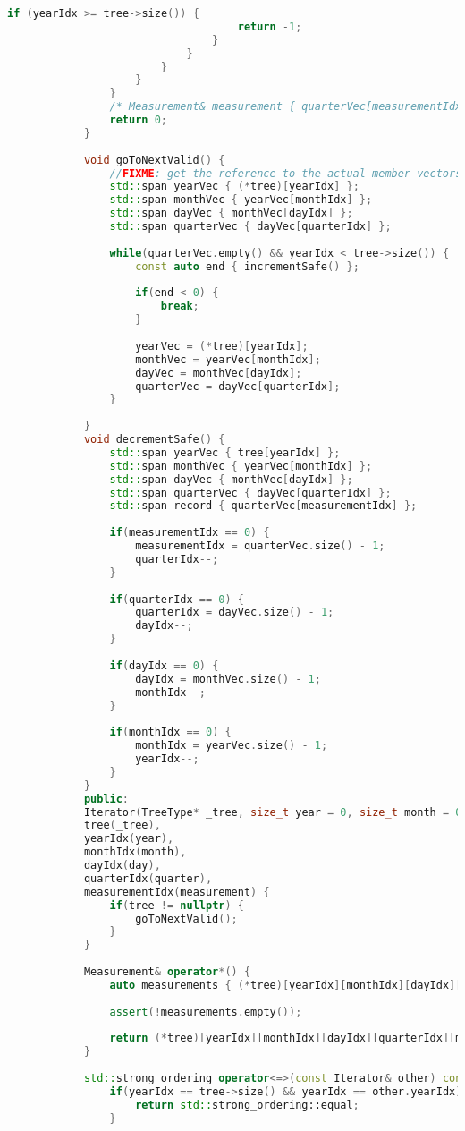 \begin{lstlisting}[caption=Zawartość pliku \texttt{MeasurementsTree.hpp}, label={lst:measurementreehpp}, language=C++]
								if (yearIdx >= tree->size()) {
									return -1;
								}
							}
						}
					}
				}
				/* Measurement& measurement { quarterVec[measurementIdx] }; */
				return 0;
			}
			
			void goToNextValid() {
				//FIXME: get the reference to the actual member vectors not the copies
				std::span yearVec { (*tree)[yearIdx] };
				std::span monthVec { yearVec[monthIdx] };
				std::span dayVec { monthVec[dayIdx] };
				std::span quarterVec { dayVec[quarterIdx] };
				
				while(quarterVec.empty() && yearIdx < tree->size()) {
					const auto end { incrementSafe() };
					
					if(end < 0) {
						break;	
					}
					
					yearVec = (*tree)[yearIdx];            
					monthVec = yearVec[monthIdx];       
					dayVec = monthVec[dayIdx];
					quarterVec = dayVec[quarterIdx];    			
				}
				
			}
			void decrementSafe() {
				std::span yearVec { tree[yearIdx] };
				std::span monthVec { yearVec[monthIdx] };
				std::span dayVec { monthVec[dayIdx] };
				std::span quarterVec { dayVec[quarterIdx] };
				std::span record { quarterVec[measurementIdx] };
				
				if(measurementIdx == 0) {
					measurementIdx = quarterVec.size() - 1;
					quarterIdx--;
				}
				
				if(quarterIdx == 0) {
					quarterIdx = dayVec.size() - 1;
					dayIdx--;
				}
				
				if(dayIdx == 0) {
					dayIdx = monthVec.size() - 1;
					monthIdx--;
				}
				
				if(monthIdx == 0) {
					monthIdx = yearVec.size() - 1;
					yearIdx--;
				}
			}
			public:
			Iterator(TreeType* _tree, size_t year = 0, size_t month = 0, size_t day = 0, size_t quarter = 0, size_t measurement = 0):
			tree(_tree),
			yearIdx(year),
			monthIdx(month),
			dayIdx(day),
			quarterIdx(quarter),
			measurementIdx(measurement) {
				if(tree != nullptr) {
					goToNextValid();
				}
			}
			
			Measurement& operator*() {
				auto measurements { (*tree)[yearIdx][monthIdx][dayIdx][quarterIdx] };
				
				assert(!measurements.empty());
				
				return (*tree)[yearIdx][monthIdx][dayIdx][quarterIdx][measurementIdx];
			}
			
			std::strong_ordering operator<=>(const Iterator& other) const {
				if(yearIdx == tree->size() && yearIdx == other.yearIdx) { // for end iterator
					return std::strong_ordering::equal;
				}
				

\end{lstlisting}
